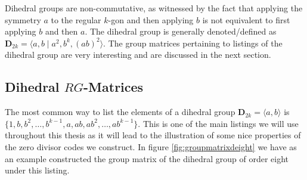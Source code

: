 Dihedral groups are non-commutative, as witnessed by the fact that applying the symmetry $a$ to the regular $k$-gon and then applying $b$ is not equivalent to first applying $b$ and then $a$.
The dihedral group is generally denoted/defined as $\mathbf{D}_{2k} = \langle a , b \mid a^2 , b^k , (ab)^2 \rangle$.
The group matrices pertaining to listings of the dihedral group are very interesting and are discussed in the next section.

\subsection{Dihedral $RG$-Matrices}
\label{sect:dihedralrgmatrices}
The most common way to list the elements of a dihedral group $\mathbf{D}_{2k} = \langle a , b \rangle $ is $\{ 1 , b , b^2 , \ldots , b^{k-1} , a , ab , ab^2 , \ldots , ab^{k-1} \} $.
This is one of the main listings we will use throughout this thesis as it will lead to the illustration of some nice properties of the zero divisor codes we construct.
In figure \ref{fig:groupmatrixdeight} we have as an example constructed the group matrix of the dihedral group of order eight under this listing.
